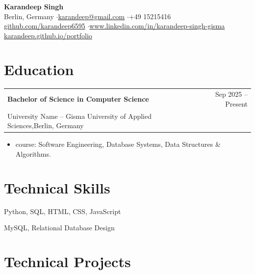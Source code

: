 \documentclass[11pt,a4paper]{article}
\begin{document}

\begin{center}
    {\Huge \textbf{Karandeep Singh}}\\[0.4em]
    \small Berlin, Germany \quad$\cdot$\quad \href{mailto:karandeep@gmail.com}{karandeep@gmail.com} \quad$\cdot$\quad +49 15215416\\[0.2em]
    \small \href{https://github.com/karandeep6595-maker/CS-Lab-Project.git}{github.com/karandeep6595} \quad$\cdot$\quad \url{www.linkedin.com/in/karandeep-singh-gisma} \href{https://karandeep6595-maker.github.io/CS-Lab-Project/}{karandeep.github.io/portfolio}
\end{center}

\vspace{-0.5em}



\section{Education}

\begin{tabularx}{\textwidth}{@{}X r@{}}
    \textbf{Bachelor of Science in Computer Science} & Sep 2025 -- Present \\
    University Name -- Gisma University of Applied Sciences,Berlin, Germany & \\
\end{tabularx}
\begin{itemize}
    \item course: Software Engineering, Database Systems, Data Structures \& Algorithms.
\end{itemize}


\section{Technical Skills}

\begin{description}[font=\normalfont\bfseries, leftmargin=0pt, style=sameline, itemsep=2pt]
    \item[Languages:] Python, SQL, HTML, CSS, JavaScript
    \item[Databases \& Storage:] MySQL, Relational Database Design
\end{description}



\section{Technical Projects}
\end{document}
